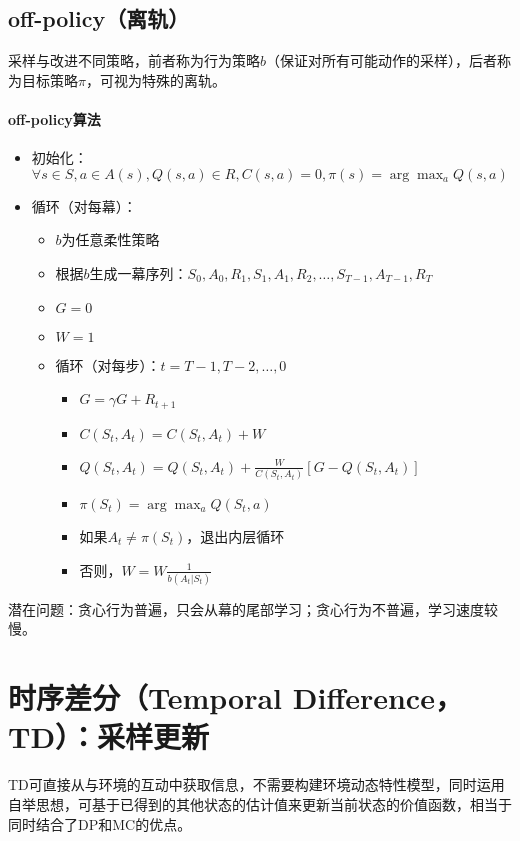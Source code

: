\documentclass[
12pt, %
a4paper, 
oneside, %
headinclude,footinclude, %
]{scrartcl}
\begin{document}
\subsection{off-policy（离轨）}
采样与改进不同策略，前者称为行为策略$ b $（保证对所有可能动作的采样），后者称为目标策略$ \pi $，可视为特殊的离轨。
\paragraph{off-policy算法}
\begin{itemize}
\item 初始化：$ \forall s \in S, a \in A(s), Q(s,a) \in R, C(s,a) = 0, \pi(s) = \arg \max_a Q(s,a) $
\item 循环（对每幕）：
\begin{itemize}
\item $ b $为任意柔性策略
\item 根据$ b $生成一幕序列：$ S_0,A_0,R_1,S_1,A_1,R_2,\dots,S_{T - 1},A_{T - 1},R_T $
\item $ G = 0 $
\item $ W = 1 $
\item 循环（对每步）：$ t = T - 1, T - 2, \dots, 0 $
\begin{itemize}
\item $ G = \gamma G + R_{t + 1} $ 
\item $ C(S_t,A_t) = C(S_t,A_t) + W $
\item $ Q(S_t,A_t) = Q(S_t,A_t) + \frac{W}{C(S_t,A_t)}[G - Q(S_t,A_t)] $
\item $ \pi(S_t) = \arg \max_a Q(S_t,a) $
\item 如果$ A_t \neq \pi(S_t) $，退出内层循环
\item 否则，$ W = W\frac{1}{b(A_t|S_t)} $
\end{itemize}
\end{itemize}
\end{itemize}

潜在问题：贪心行为普遍，只会从幕的尾部学习；贪心行为不普遍，学习速度较慢。
\section{时序差分（Temporal Difference，TD）：采样更新}
TD可直接从与环境的互动中获取信息，不需要构建环境动态特性模型，同时运用自举思想，可基于已得到的其他状态的估计值来更新当前状态的价值函数，相当于同时结合了DP和MC的优点。
\end{document}
